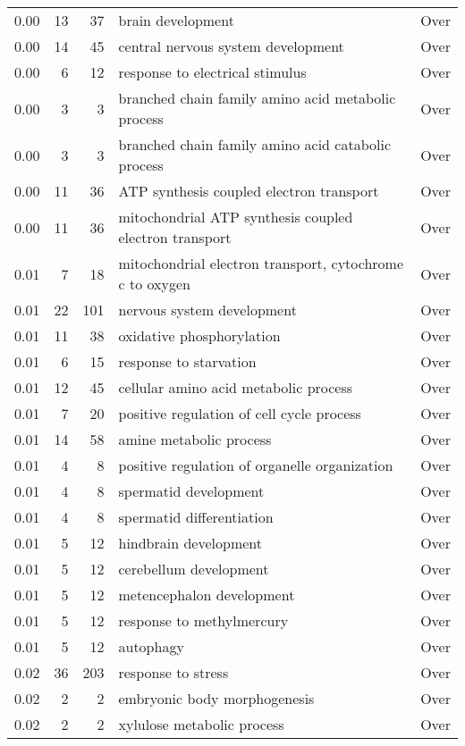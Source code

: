 \documentclass[10pt]{bmc_article}
\newenvironment{bmcformat}{\begin{raggedright}\baselineskip20pt\sloppy\setboolean{publ}{false}}{\end{raggedright}\baselineskip20pt\sloppy}
\begin{document}
\begin{bmcformat}
\begin{longtable}{rrrp{4cm}r}
   \hline
0.00 &  13 &  37 & brain development & Over \\ 
  0.00 &  14 &  45 & central nervous system development & Over \\ 
  0.00 &   6 &  12 & response to electrical stimulus & Over \\ 
  0.00 &   3 &   3 & branched chain family amino acid metabolic process & Over \\ 
  0.00 &   3 &   3 & branched chain family amino acid catabolic process & Over \\ 
  0.00 &  11 &  36 & ATP synthesis coupled electron transport & Over \\ 
  0.00 &  11 &  36 & mitochondrial ATP synthesis coupled electron transport & Over \\ 
  0.01 &   7 &  18 & mitochondrial electron transport, cytochrome c to oxygen & Over \\ 
  0.01 &  22 & 101 & nervous system development & Over \\ 
  0.01 &  11 &  38 & oxidative phosphorylation & Over \\ 
  0.01 &   6 &  15 & response to starvation & Over \\ 
  0.01 &  12 &  45 & cellular amino acid metabolic process & Over \\ 
  0.01 &   7 &  20 & positive regulation of cell cycle process & Over \\ 
  0.01 &  14 &  58 & amine metabolic process & Over \\ 
  0.01 &   4 &   8 & positive regulation of organelle organization & Over \\ 
  0.01 &   4 &   8 & spermatid development & Over \\ 
  0.01 &   4 &   8 & spermatid differentiation & Over \\ 
  0.01 &   5 &  12 & hindbrain development & Over \\ 
  0.01 &   5 &  12 & cerebellum development & Over \\ 
  0.01 &   5 &  12 & metencephalon development & Over \\ 
  0.01 &   5 &  12 & response to methylmercury & Over \\ 
  0.01 &   5 &  12 & autophagy & Over \\ 
  0.02 &  36 & 203 & response to stress & Over \\ 
  0.02 &   2 &   2 & embryonic body morphogenesis & Over \\ 
  0.02 &   2 &   2 & xylulose metabolic process & Over \\ 

\end{longtable}
\end{bmcformat}
\end{document}
